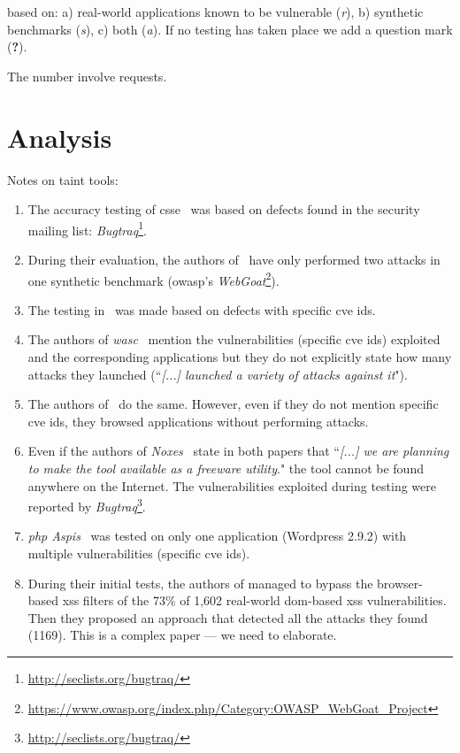 \documentclass[conference]{IEEEtran}
\begin{document}
\begin{landscape}
\begin{table}
\begin{threeparttable}
\begin{small}
\begin{tablenotes}
\begin{footnotesize}
	based on: a) real-world applications known to be vulnerable ({\it r}), b) synthetic benchmarks ({\it s}), c) both ({\it a}).
	If no testing has taken place we add a question mark ({\bf ?}).
    \item[3] The number involve requests.
	\end{footnotesize}
    \end{tablenotes}
    \end{small}
    \end{threeparttable}
\end{table}
\end{landscape}

\section{Analysis}

Notes on taint tools:
\begin{enumerate}
\item The accuracy testing of {\sc csse}~\cite{PB05} was based on 
defects found in the security mailing
list: {\it Bugtraq}\footnote{\url{http://seclists.org/bugtraq/}}.
\item During their evaluation, the authors of~\cite{HCF05} have only performed
two attacks in one synthetic benchmark ({\sc owasp}'s
{\it WebGoat}\footnote{\url{https://www.owasp.org/index.php/Category:OWASP_WebGoat_Project}}).
\item The testing in~\cite{XBS06} was made based on
defects with specific {\sc cve id}s.
\item The authors of {\it {\sc wasc}}~\cite{NLC07}
mention the vulnerabilities (specific {\sc cve id}s)
exploited and the corresponding applications but they do not explicitly
state how many attacks they launched (``{\it [...] launched a variety of
attacks against it}").
\item The authors of~\cite{VFJKKV07} do the same.
However, even if they do not mention specific {\sc cve id}s,
they browsed applications without performing attacks.
\item Even if the authors of {\it Noxes}~\cite{KKVJ06,KJKV09} state in
both papers that ``{\it [...] we are planning to make the tool available as
a freeware utility}." the tool cannot be found anywhere on the Internet.
The vulnerabilities exploited during testing were reported
by {\it Bugtraq}\footnote{\url{http://seclists.org/bugtraq/}}.
\item {\it {\sc php} Aspis}~\cite{PMP11} was tested on only one
application (Wordpress 2.9.2) with multiple vulnerabilities (specific {\sc cve id}s).
\item During their initial tests, the authors of
managed to bypass the browser-based {\sc xss} filters of the
73\% of 1,602 real-world {\sc dom}-based {\sc xss} vulnerabilities.
Then they proposed an approach that detected all the attacks they
found (1169). This is a complex paper --- we need to elaborate.
\end{enumerate}
\end{document}
